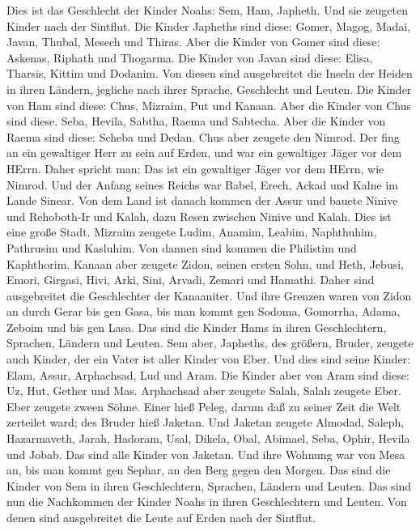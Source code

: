  Dies ist das Geschlecht der Kinder Noahs: Sem, Ham,
Japheth. Und sie zeugeten Kinder nach der Sintflut.  Die
Kinder Japheths sind diese: Gomer, Magog, Madai, Javan, Thubal, Mesech
und Thiras.  Aber die Kinder von Gomer sind diese: Askenas,
Riphath und Thogarma.  Die Kinder von Javan sind diese:
Elisa, Tharsis, Kittim und Dodanim.  Von diesen sind
ausgebreitet die Inseln der Heiden in ihren Ländern, jegliche nach ihrer
Sprache, Geschlecht und Leuten.  Die Kinder von Ham sind
diese: Chus, Mizraim, Put und Kanaan.  Aber die Kinder von
Chus sind diese. Seba, Hevila, Sabtha, Raema und Sabtecha. Aber die
Kinder von Raema sind diese: Scheba und Dedan.  Chus aber
zeugete den Nimrod. Der fing an ein gewaltiger Herr zu sein auf Erden,
 und war ein gewaltiger Jäger vor dem HErrn. Daher spricht
man: Das ist ein gewaltiger Jäger vor dem HErrn, wie Nimrod.
 Und der Anfang seines Reichs war Babel, Erech, Ackad und
Kalne im Lande Sinear.  Von dem Land ist danach kommen der
Assur und bauete Ninive und Rehoboth-Ir und Kalah,  dazu
Resen zwischen Ninive und Kalah. Dies ist eine große Stadt.
 Mizraim zeugete Ludim, Anamim, Leabim, Naphthuhim,
 Pathrusim und Kasluhim. Von dannen sind kommen die
Philistim und Kaphthorim.  Kanaan aber zeugete Zidon,
seinen ersten Sohn, und Heth,  Jebusi, Emori, Girgasi,
 Hivi, Arki, Sini,  Arvadi, Zemari und
Hamathi. Daher sind ausgebreitet die Geschlechter der Kanaaniter.
 Und ihre Grenzen waren von Zidon an durch Gerar bis gen
Gasa, bis man kommt gen Sodoma, Gomorrha, Adama, Zeboim und bis gen
Lasa.  Das sind die Kinder Hams in ihren Geschlechtern,
Sprachen, Ländern und Leuten.  Sem aber, Japheths, des
größern, Bruder, zeugete auch Kinder, der ein Vater ist aller Kinder von
Eber.  Und dies sind seine Kinder: Elam, Assur, Arphachsad,
Lud und Aram.  Die Kinder aber von Aram sind diese: Uz,
Hut, Gether und Mas.  Arphachsad aber zeugete Salah, Salah
zeugete Eber.  Eber zeugete zween Söhne. Einer hieß Peleg,
darum daß zu seiner Zeit die Welt zerteilet ward; des Bruder hieß
Jaketan.  Und Jaketan zeugete Almodad, Saleph, Hazarmaveth,
Jarah,  Hadoram, Usal, Dikela,  Obal, Abimael,
Seba,  Ophir, Hevila und Jobab. Das sind alle Kinder von
Jaketan.  Und ihre Wohnung war von Mesa an, bis man kommt
gen Sephar, an den Berg gegen den Morgen.  Das sind die
Kinder von Sem in ihren Geschlechtern, Sprachen, Ländern und Leuten.
 Das sind nun die Nachkommen der Kinder Noahs in ihren
Geschlechtern und Leuten. Von denen sind ausgebreitet die Leute auf
Erden nach der Sintflut.


